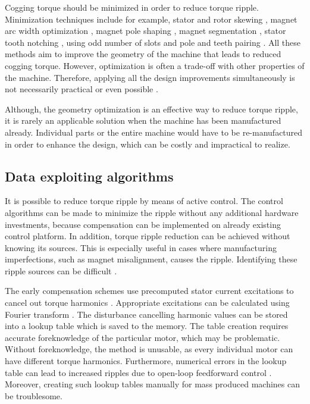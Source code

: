 Cogging torque should be minimized in order to reduce torque ripple. Minimization techniques include for example, stator and rotor skewing \cite{CTR_HW:1994, CTR_HW:2001, CTR_HW:2002, CTR_Analytical:2009, CTR_HW:2013}, magnet arc width optimization \cite{CTR_HW:2002, CTR_HW:2003, CTR_HW:2001}, magnet pole shaping \cite{CTR_HW:1994, CTR_HW:2004}, magnet segmentation \cite{CTR_HW:2002, CTR:2010, CTR_SW:2017}, stator tooth notching \cite{CTR_HW:1994, CTR_HW:2002}, using odd number of slots \cite{CTR_HW_SLOTN:2011} and pole and teeth pairing \cite{CTR_HW:2001}. All these methods aim to improve the geometry of the machine that leads to reduced cogging torque. However, optimization is often a trade-off with other properties of the machine. Therefore, applying all the design improvements simultaneously is not necessarily practical or even possible \cite{CTR_HW:2002, CTR_HW:2013}.

Although, the geometry optimization is an effective way to reduce torque ripple, it is rarely an applicable solution when the machine has been manufactured already. Individual parts or the entire machine would have to be re-manufactured in order to enhance the design, which can be costly and impractical to realize.


\subsection{Data exploiting algorithms}
It is possible to reduce torque ripple by means of active control. The control algorithms can be made to minimize the ripple without any additional hardware investments, because compensation can be implemented on already existing control platform. In addition, torque ripple reduction can be achieved without knowing its sources. This is especially useful in cases where manufacturing imperfections, such as magnet misalignment, causes the ripple. Identifying these ripple sources can be difficult \cite{TRR_SW:2019}.

The early compensation schemes use precomputed stator current excitations to cancel out torque harmonics \cite{ILC:2005}. Appropriate excitations can be calculated using Fourier transform \cite{CTR_SW:1993, CTR_SW:1994}. The disturbance cancelling harmonic values can be stored into a lookup table which is saved to the memory. The table creation requires accurate foreknowledge of the particular motor, which may be problematic. Without foreknowledge, the method is unusable, as every individual motor can have different torque harmonics. Furthermore, numerical errors in the lookup table can lead to increased ripples due to open-loop feedforward control \cite{ILC:2018}. Moreover, creating such lookup tables manually for mass produced machines can be troublesome.

